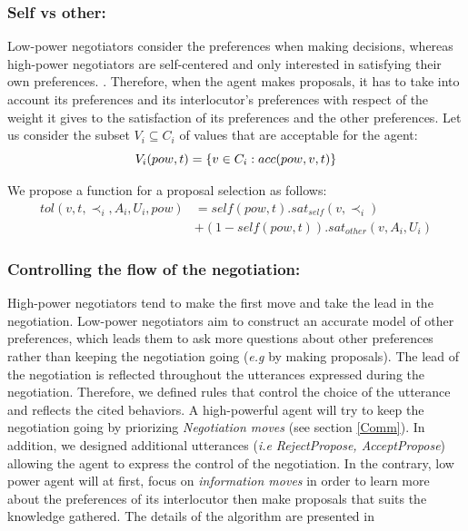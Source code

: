 \documentclass[runningheads,a4paper]{llncs}
\begin{document}
	
	\subsubsection{Self vs other:} Low-power negotiators consider the preferences when making decisions, whereas high-power negotiators are self-centered and only interested in satisfying their own preferences. \cite{fiske1993controlling,de1995impact}.
	Therefore, when the agent makes proposals, it has to take into account its preferences and its interlocutor's preferences with respect of the weight it gives to the satisfaction of its preferences and the other preferences.	
	Let us consider the subset $V_i\subseteq C_i$ of values that are acceptable for the agent:
	\vspace{-0.5em} 
	\begin{equation}
	V_i(pow,t) = \{ v\in C_i : acc(pow,v,t) \}
	\vspace{-0.5em}
	\end{equation}
	
	We propose a function for a proposal selection as follows:
	\begin{equation}
	\begin{split}
	tol(v, t, \prec_i, A_i, U_i, pow) & = self(pow, t) . sat_{self}(v, \prec_i) \\
	& +  (1 - self(pow, t)) . sat_{other}(v, A_i, U_i)
	\end{split}
	\end{equation}
	
	\subsubsection{Controlling the flow of the negotiation:}
	High-power negotiators tend to make the first move \cite{magee2007power} and take the lead in the negotiation. Low-power negotiators aim to construct an accurate model of other preferences, which leads them to ask more questions about other preferences rather than keeping the negotiation going (\emph{e.g} by making proposals)\cite{de2004influence}.
	The lead of the negotiation is reflected throughout the utterances expressed during the negotiation. Therefore, we defined rules that control the choice of the utterance and reflects the cited behaviors. A high-powerful agent will try to keep the negotiation going by priorizing \emph{Negotiation moves} (see section \ref{Comm}). In addition, we designed additional utterances (\textit{i.e} \emph{RejectPropose, AcceptPropose}) allowing the agent to express the control of the negotiation.
	In the contrary, low power agent will at first, focus on \emph{information moves} in order to learn more about the preferences of its interlocutor then make proposals that suits the knowledge gathered. 
	The details of the algorithm are presented in \cite {ouali2017computational}
	
\end{document}
